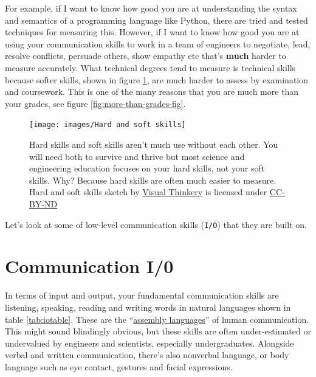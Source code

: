 \documentclass[
]{book}
\begin{document}
For example, if I want to know how good you are at understanding the syntax and semantics of a programming language like Python, there are tried and tested techniques for measuring this. However, if I want to know how good you are at using your communication skills to work in a team of engineers to negotiate, lead, resolve conflicts, persuade others, show empathy etc that's \textbf{much} harder to measure accurately. What technical degrees tend to measure is technical skills because softer skills, shown in figure \ref{fig:allskills-fig}, are much harder to assess by examination and coursework. This is one of the many reasons that you are much more than your grades, see figure \ref{fig:more-than-grades-fig}.

\begin{figure}

{\centering \texttt{[image: images/Hard and soft skills]} 

}

\caption{Hard skills and soft skills aren't much use without each other. You will need both to survive and thrive but most science and engineering education focuses on your hard skills, not your soft skills. Why? Because hard skills are often much easier to measure. Hard and soft skills sketch by \href{https://visualthinkery.com/}{Visual Thinkery} is licensed under \href{https://creativecommons.org/licenses/by-nd/4.0/}{CC-BY-ND}}\label{fig:allskills-fig}
\end{figure}



Let's look at some of low-level communication skills (\texttt{I/O}) that they are built on.

\hypertarget{cio}{%
\section{Communication I/0}\label{cio}}

In terms of input and output, your fundamental communication skills are listening, speaking, reading and writing words in natural languages shown in table \ref{tab:iotable}. These are the ``\href{https://en.wikipedia.org/wiki/Assembly_language}{assembly languages}'' of human communication. This might sound blindingly obvious, but these skills are often under-estimated or undervalued by engineers and scientists, especially undergraduates. Alongside verbal and written communication, there's also nonverbal language, or body language such as eye contact, gestures and facial expressions.
\end{document}
